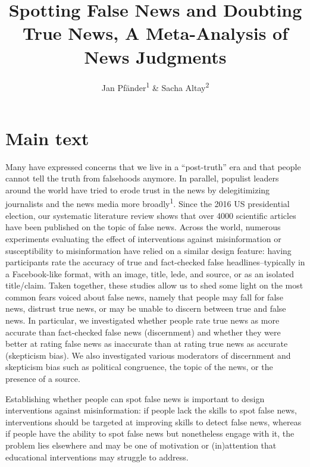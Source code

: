 \documentclass[
  doc,floatsintext]{apa6}
\title{Spotting False News and Doubting True News, A Meta-Analysis of News Judgments}
\author{Jan Pfänder\textsuperscript{1} \& Sacha Altay\textsuperscript{2}}
\date{}
\affiliation{\vspace{0.5cm}\textsuperscript{1} Institut Jean Nicod, Département d'études cognitives, ENS, EHESS, PSL University, CNRS, France\\\textsuperscript{2} Department of Political Science, University of Zurich, Switzerland}
\begin{document}
\maketitle

\clearpage

\section{Main text}\label{main-text}

Many have expressed concerns that we live in a ``post-truth'' era and that people cannot tell the truth from falsehoods anymore. In parallel, populist leaders around the world have tried to erode trust in the news by delegitimizing journalists and the news media more broadly\textsuperscript{1}. Since the 2016 US presidential election, our systematic literature review shows that over 4000 scientific articles have been published on the topic of false news. Across the world, numerous experiments evaluating the effect of interventions against misinformation or susceptibility to misinformation have relied on a similar design feature: having participants rate the accuracy of true and fact-checked false headlines--typically in a Facebook-like format, with an image, title, lede, and source, or as an isolated title/claim. Taken together, these studies allow us to shed some light on the most common fears voiced about false news, namely that people may fall for false news, distrust true news, or may be unable to discern between true and false news. In particular, we investigated whether people rate true news as more accurate than fact-checked false news (discernment) and whether they were better at rating false news as inaccurate than at rating true news as accurate (skepticism bias). We also investigated various moderators of discernment and skepticism bias such as political congruence, the topic of the news, or the presence of a source.

Establishing whether people can spot false news is important to design interventions against misinformation: if people lack the skills to spot false news, interventions should be targeted at improving skills to detect false news, whereas if people have the ability to spot false news but nonetheless engage with it, the problem lies elsewhere and may be one of motivation or (in)attention that educational interventions may struggle to address.
\end{document}
